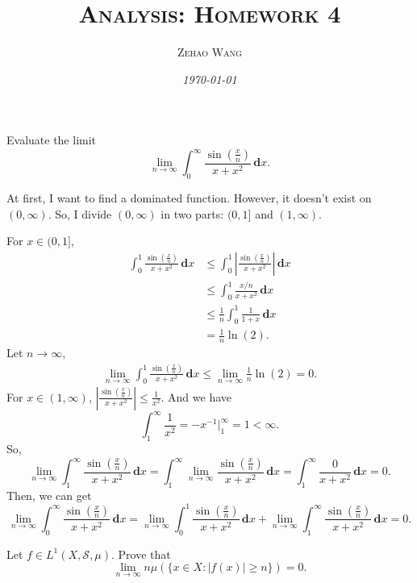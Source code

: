 \documentclass[12pt]{article}
\title{\textsc{Analysis: Homework 4}}
\author{\textsc{Zehao Wang}}
\date{\emph{\today}}
\newenvironment{exercise}[1]{\begin{tcolorbox}[colback=black!15, colframe=black!80, breakable, title=#1]}{\end{tcolorbox}}
\newenvironment{solution}{\begin{tcolorbox}[colback=white, colframe=black!50, breakable, title=Solution. ]\setlength{\parskip}{0.8em}}{\end{tcolorbox}}
\newcommand{\der}{\,\mathbf{d}}
\begin{document}
    \maketitle

    \begin{exercise}{1}
        Evaluate the limit
        \[
            \lim_{n\to \infty}\int_0^\infty\frac{\sin\left(\frac{x}{n}\right)}{x+x^2}\der x. 
        \]
    \end{exercise}

    \begin{solution}
        At first, I want to find a dominated function. However, it doesn't exist on $(0,\infty)$. So, I divide $(0,\infty)$ in two parts: $(0,1]$ and $(1,\infty)$. 

        For $x\in (0,1]$, 
        \[
            \begin{aligned}
                \int_0^1\frac{\sin\left(\frac{x}{n}\right)}{x+x^2}\der x & \leqslant\int_0^1\left|\frac{\sin\left(\frac{x}{n}\right)}{x+x^2}\right|\der x\\
                & \leqslant\int_0^1\frac{x/n}{x+x^2}\der x\\
                & \leqslant\frac{1}{n}\int_0^1\frac{1}{1+x}\der x\\
                & =\frac{1}{n}\ln(2). 
            \end{aligned}
        \]
        Let $n\to\infty$, 
        \[
            \begin{aligned}
                \lim_{n\to\infty}\int_0^1\frac{\sin\left(\frac{x}{n}\right)}{x+x^2}\der x \leqslant\lim_{n\to\infty}\frac{1}{n}\ln(2)=0. 
            \end{aligned}
        \]
        For $x\in(1,\infty)$, $\left|\frac{\sin\left(\frac{x}{n}\right)}{x+x^2}\right|\leqslant\frac{1}{x^2}$. And we have
        \[
            \int_1^\infty\frac{1}{x^2}=-x^{-1}\big|_1^\infty=1<\infty. 
        \]
        So, 
        \[
            \lim_{n\to\infty}\int_1^\infty\frac{\sin\left(\frac{x}{n}\right)}{x+x^2}\der x =\int_1^\infty\lim_{n\to\infty}\frac{\sin\left(\frac{x}{n}\right)}{x+x^2}\der x=\int_1^\infty\frac{0}{x+x^2}\der x=0. 
        \]
        Then, we can get
        \[
            \lim_{n\to \infty}\int_0^\infty\frac{\sin\left(\frac{x}{n}\right)}{x+x^2}\der x=\lim_{n\to \infty}\int_0^1\frac{\sin\left(\frac{x}{n}\right)}{x+x^2}\der x+\lim_{n\to \infty}\int_1^\infty\frac{\sin\left(\frac{x}{n}\right)}{x+x^2}\der x=0. 
        \]
    \end{solution}

    \begin{exercise}{2}
        Let $f\in L^1(X,\mathscr{S},\mu)$. Prove that
        \[
            \lim_{n\to\infty}n\mu(\{x\in X: |f(x)|\geqslant n\})=0. 
        \]
        
    \end{exercise}
\end{document}
